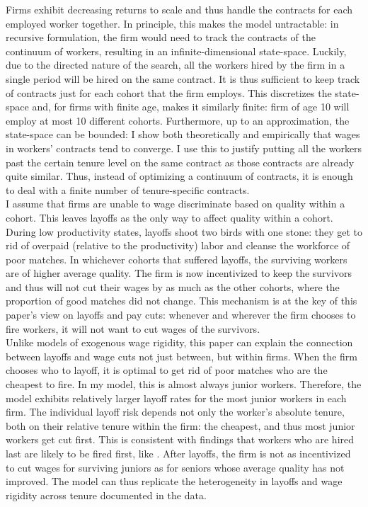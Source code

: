 Firms exhibit decreasing returns to scale and thus handle the contracts for each employed worker together. In principle, this makes the model untractable: in recursive formulation, the firm would need to track the contracts of the continuum of workers, resulting in an infinite-dimensional state-space. Luckily, due to the directed nature of the search, all the workers hired by the firm in a single period will be hired on the same contract. It is thus sufficient to keep track of contracts just for each cohort that the firm employs. This discretizes the state-space and, for firms with finite age, makes it similarly finite: firm of age 10 will employ at most 10 different cohorts. Furthermore, up to an approximation, the state-space can be bounded: I show both theoretically and empirically that wages in workers' contracts tend to converge. I use this to justify putting all the workers past the certain tenure level on the same contract as those contracts are already quite similar. Thus, instead of optimizing a continuum of contracts, it is enough to deal with a finite number of tenure-specific contracts. \\
I assume that firms are unable to wage discriminate based on quality within a cohort. This leaves layoffs as the only way to affect quality within a cohort. During low productivity states, layoffs shoot two birds with one stone: they get to rid of overpaid (relative to the productivity) labor and cleanse the workforce of poor matches. In whichever cohorts that suffered layoffs, the surviving workers are of higher average quality. The firm is now incentivized to keep the survivors and thus will not cut their wages by as much as the other cohorts, where the proportion of good matches did not change. This mechanism is at the key of this paper's view on layoffs and pay cuts: whenever and wherever the firm chooses to fire workers, it will not want to cut wages of the survivors. \\
Unlike models of exogenous wage rigidity, this paper can explain the connection between layoffs and wage cuts not just between, but within firms. When the firm chooses who to layoff, it is optimal to get rid of poor matches who are the cheapest to fire. In my model, this is almost always junior workers. Therefore, the model exhibits relatively larger layoff rates for the most junior workers in each firm. The individual layoff risk depends not only the worker's absolute tenure, both on their relative tenure within the firm: the cheapest, and thus most junior workers get cut first. This is consistent with findings that workers who are hired last are likely to be fired first, like \textcite{buhai2014}. After layoffs, the firm is not as incentivized to cut wages for surviving juniors as for seniors whose average quality has not improved. The model can thus replicate the heterogeneity in layoffs and wage rigidity across tenure documented in the data.
